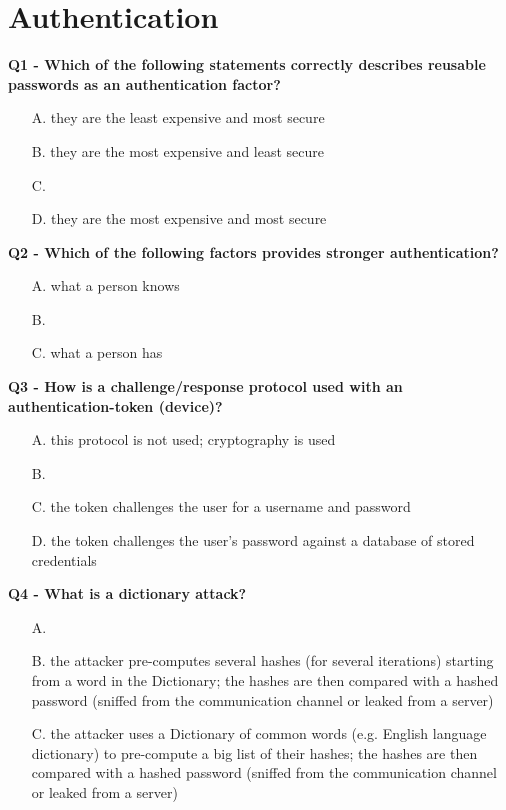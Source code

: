 \section{Authentication}
\textbf{Q1 - Which of the following statements correctly describes reusable passwords as an authentication factor?}
\begin{enumerate}
    \item[A.] they are the least expensive and most secure
    \item[B.] they are the most expensive and least secure
    \item[C.] 
    \item[D.] they are the most expensive and most secure
\end{enumerate}

\textbf{Q2 - Which of the following factors provides stronger authentication?}
\begin{enumerate}
    \item[A.] what a person knows
    \item[B.] 
    \item[C.] what a person has
\end{enumerate}

\textbf{Q3 - How is a challenge/response protocol used with an authentication-token (device)?}
\begin{enumerate}
    \item[A.] this protocol is not used; cryptography is used
    \item[B.] 
    \item[C.] the token challenges the user for a username and password
    \item[D.] the token challenges the user’s password against a database of stored credentials
\end{enumerate}

\textbf{Q4 - What is a dictionary attack?}
\begin{enumerate}
    \item[A.] 
    \item[B.] the attacker pre-computes several hashes (for several iterations) starting from a word in the Dictionary; the hashes are then compared with a hashed password (sniffed from the communication channel or leaked from a server)
    \item[C.] the attacker uses a Dictionary of common words (e.g. English language dictionary) to pre-compute a big list of their hashes; the hashes are then compared with a hashed password (sniffed from the communication channel or leaked from a server)
\end{enumerate}

